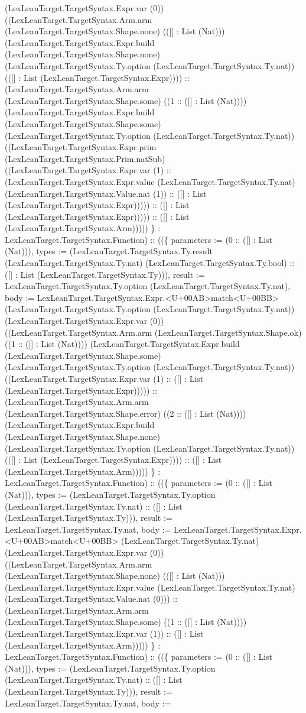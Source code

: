 \documentclass[11pt]{article}
\begin{document}
(LexLeanTarget.TargetSyntax.Expr.var (0)) ((LexLeanTarget.TargetSyntax.Arm.arm (LexLeanTarget.TargetSyntax.Shape.none) (([] : List (Nat))) (LexLeanTarget.TargetSyntax.Expr.build (LexLeanTarget.TargetSyntax.Shape.none) (LexLeanTarget.TargetSyntax.Ty.option (LexLeanTarget.TargetSyntax.Ty.nat)) (([] : List (LexLeanTarget.TargetSyntax.Expr)))) :: (LexLeanTarget.TargetSyntax.Arm.arm (LexLeanTarget.TargetSyntax.Shape.some) ((1 :: ([] : List (Nat)))) (LexLeanTarget.TargetSyntax.Expr.build (LexLeanTarget.TargetSyntax.Shape.some) (LexLeanTarget.TargetSyntax.Ty.option (LexLeanTarget.TargetSyntax.Ty.nat)) ((LexLeanTarget.TargetSyntax.Expr.prim (LexLeanTarget.TargetSyntax.Prim.natSub) ((LexLeanTarget.TargetSyntax.Expr.var (1) :: (LexLeanTarget.TargetSyntax.Expr.value (LexLeanTarget.TargetSyntax.Ty.nat) (LexLeanTarget.TargetSyntax.Value.nat (1)) :: ([] : List (LexLeanTarget.TargetSyntax.Expr))))) :: ([] : List (LexLeanTarget.TargetSyntax.Expr))))) :: ([] : List (LexLeanTarget.TargetSyntax.Arm))))) \} : LexLeanTarget.TargetSyntax.Function) :: ((\{ parameters := (0 :: ([] : List (Nat))), types := (LexLeanTarget.TargetSyntax.Ty.result (LexLeanTarget.TargetSyntax.Ty.nat) (LexLeanTarget.TargetSyntax.Ty.bool) :: ([] : List (LexLeanTarget.TargetSyntax.Ty))), result := LexLeanTarget.TargetSyntax.Ty.option (LexLeanTarget.TargetSyntax.Ty.nat), body := LexLeanTarget.TargetSyntax.Expr.<U+00AB>match<U+00BB> (LexLeanTarget.TargetSyntax.Ty.option (LexLeanTarget.TargetSyntax.Ty.nat)) (LexLeanTarget.TargetSyntax.Expr.var (0)) ((LexLeanTarget.TargetSyntax.Arm.arm (LexLeanTarget.TargetSyntax.Shape.ok) ((1 :: ([] : List (Nat)))) (LexLeanTarget.TargetSyntax.Expr.build (LexLeanTarget.TargetSyntax.Shape.some) (LexLeanTarget.TargetSyntax.Ty.option (LexLeanTarget.TargetSyntax.Ty.nat)) ((LexLeanTarget.TargetSyntax.Expr.var (1) :: ([] : List (LexLeanTarget.TargetSyntax.Expr))))) :: (LexLeanTarget.TargetSyntax.Arm.arm (LexLeanTarget.TargetSyntax.Shape.error) ((2 :: ([] : List (Nat)))) (LexLeanTarget.TargetSyntax.Expr.build (LexLeanTarget.TargetSyntax.Shape.none) (LexLeanTarget.TargetSyntax.Ty.option (LexLeanTarget.TargetSyntax.Ty.nat)) (([] : List (LexLeanTarget.TargetSyntax.Expr)))) :: ([] : List (LexLeanTarget.TargetSyntax.Arm))))) \} : LexLeanTarget.TargetSyntax.Function) :: ((\{ parameters := (0 :: ([] : List (Nat))), types := (LexLeanTarget.TargetSyntax.Ty.option (LexLeanTarget.TargetSyntax.Ty.nat) :: ([] : List (LexLeanTarget.TargetSyntax.Ty))), result := LexLeanTarget.TargetSyntax.Ty.nat, body := LexLeanTarget.TargetSyntax.Expr.<U+00AB>match<U+00BB> (LexLeanTarget.TargetSyntax.Ty.nat) (LexLeanTarget.TargetSyntax.Expr.var (0)) ((LexLeanTarget.TargetSyntax.Arm.arm (LexLeanTarget.TargetSyntax.Shape.none) (([] : List (Nat))) (LexLeanTarget.TargetSyntax.Expr.value (LexLeanTarget.TargetSyntax.Ty.nat) (LexLeanTarget.TargetSyntax.Value.nat (0))) :: (LexLeanTarget.TargetSyntax.Arm.arm (LexLeanTarget.TargetSyntax.Shape.some) ((1 :: ([] : List (Nat)))) (LexLeanTarget.TargetSyntax.Expr.var (1)) :: ([] : List (LexLeanTarget.TargetSyntax.Arm))))) \} : LexLeanTarget.TargetSyntax.Function) :: ((\{ parameters := (0 :: ([] : List (Nat))), types := (LexLeanTarget.TargetSyntax.Ty.option (LexLeanTarget.TargetSyntax.Ty.nat) :: ([] : List (LexLeanTarget.TargetSyntax.Ty))), result := LexLeanTarget.TargetSyntax.Ty.nat, body := 
\end{document}
